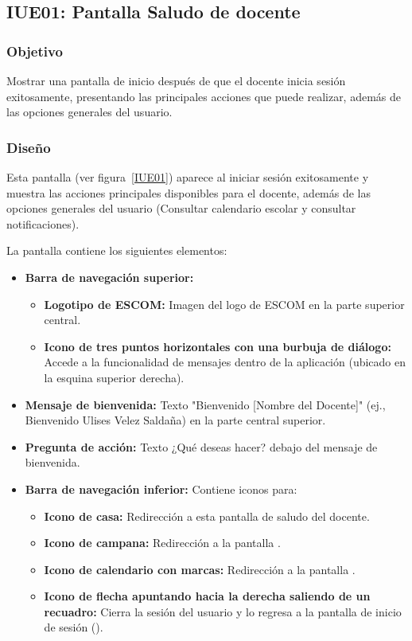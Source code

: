 \subsection{IUE01: Pantalla Saludo de docente}

\newpage	

\subsubsection{Objetivo}
Mostrar una pantalla de inicio después de que el docente inicia sesión exitosamente, presentando las principales acciones que puede realizar, además de las opciones generales del usuario.

\subsubsection{Diseño}
Esta pantalla  (ver figura~\ref{IUE01}) aparece al iniciar sesión exitosamente y muestra las acciones principales disponibles para el docente, además de las opciones generales del usuario (Consultar calendario escolar y consultar notificaciones).



La pantalla contiene los siguientes elementos:
\begin{itemize}
	\item \textbf{Barra de navegación superior:}
	\begin{itemize}
		\item \textbf{Logotipo de ESCOM:} Imagen del logo de ESCOM en la parte superior central.
		\item \textbf{Icono de tres puntos horizontales con una burbuja de diálogo:} Accede a la funcionalidad de mensajes dentro de la aplicación (ubicado en la esquina superior derecha).
	\end{itemize}
	\item \textbf{Mensaje de bienvenida:} Texto "Bienvenido [Nombre del Docente]" (ej., Bienvenido Ulises Velez Saldaña) en la parte central superior.
	\item \textbf{Pregunta de acción:} Texto ¿Qué deseas hacer? debajo del mensaje de bienvenida.
	\item \textbf{Barra de navegación inferior:} Contiene iconos para:
	\begin{itemize}
		\item \textbf{Icono de casa:} Redirección a esta pantalla de saludo del docente.
		\item \textbf{Icono de campana:} Redirección a la pantalla .
		\item \textbf{Icono de calendario con marcas:} Redirección a la pantalla .
		\item \textbf{Icono de flecha apuntando hacia la derecha saliendo de un recuadro:} Cierra la sesión del usuario y lo regresa a la pantalla de inicio de sesión ().
	\end{itemize}
\end{itemize}

